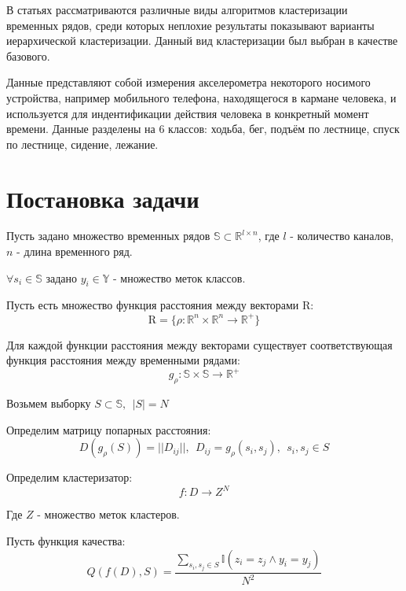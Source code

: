 \documentclass[12pt,twoside]{article}
\begin{document}
        В статьях \cite{WARRENLIAO20051857} \cite{AGHABOZORGI201516} рассматриваются различные виды алгоритмов кластеризации временных рядов,
        среди которых неплохие результаты показывают варианты иерархической кластеризации.
        Данный вид кластеризации был выбран в качестве базового.
        
        Данные \cite{Kwapisz:2011:ARU:1964897.1964918} представляют собой измерения акселерометра некоторого носимого устройства,
        например мобильного телефона, находящегося в кармане человека, и используется для индентификации действия человека в конкретный момент времени.
        Данные разделены на 6 классов: ходьба, бег, подъём по лестнице, спуск по лестнице, сидение, лежание.
				
    \section{Постановка задачи}
        
        Пусть задано множество временных рядов $\mathbb{S} \subset \mathbb{R}^{l \times n}$,
        где $l$ \-- количество каналов, $n$ \-- длина временного ряд.

        $\forall s_i \in \mathbb{S}$ задано ${y_i \in \mathbb{Y}}$ \-- множество меток классов.

        Пусть есть множество функция расстояния между векторами $\mathrm{R}$:
        $$
            \mathrm{R} = \{\rho: \mathbb{R}^n \times \mathbb{R}^n \rightarrow \mathbb{R}^+ \}
        $$

        Для каждой функции расстояния между векторами существует соответствующая функция расстояния между временными рядами:
        $$
            g_{\rho}: \mathbb{S} \times \mathbb{S} \rightarrow \mathbb{R}^+ 
        $$

        Возьмем выборку $ S \subset \mathbb{S}, \ \ |S| = N$

        Определим матрицу попарных расстояния:
        $$
            D(g_\rho(S)) = ||D_{ij}||, \ \ D_{ij} = g_\rho(s_i, s_j),\ \ s_i, s_j \in S 
        $$
        
        Определим кластеризатор:
        $$
            f: D \rightarrow Z^N
        $$

        Где $Z$ \-- множество меток кластеров.

        Пусть функция качества:
        $$
            Q(f(D), S) = \frac{\sum\limits_{s_i, s_j \in S} \mathbb{I}(z_i = z_j \land  y_i = y_j)}{N^2}
        $$
\end{document}
